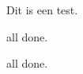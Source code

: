 \documentclass{article}
\begin{document}

Dit is een test.

all done.




 all done.
\end{document}

